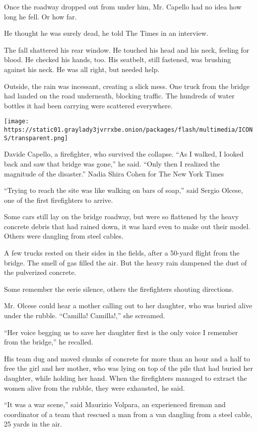 Once the roadway dropped out from under him, Mr. Capello had no idea how
long he fell. Or how far.

He thought he was surely dead, he told The Times in an interview.

The fall shattered his rear window. He touched his head and his neck,
feeling for blood. He checked his hands, too. His seatbelt, still
fastened, was brushing against his neck. He was all right, but needed
help.

Outside, the rain was incessant, creating a slick mess. One truck from
the bridge had landed on the road underneath, blocking traffic. The
hundreds of water bottles it had been carrying were scattered
everywhere.

\texttt{[image: https://static01.graylady3jvrrxbe.onion/packages/flash/multimedia/ICONS/transparent.png]}

Davide Capello, a firefighter, who survived the collapse. ``As I walked,
I looked back and saw that bridge was gone,'' he said. ``Only then I
realized the magnitude of the disaster.'' Nadia Shira Cohen for The New
York Times

``Trying to reach the site was like walking on bars of soap,'' said
Sergio Olcese, one of the first firefighters to arrive.

Some cars still lay on the bridge roadway, but were so flattened by the
heavy concrete debris that had rained down, it was hard even to make out
their model. Others were dangling from steel cables.

A few trucks rested on their sides in the fields, after a 50-yard flight
from the bridge. The smell of gas filled the air. But the heavy rain
dampened the dust of the pulverized concrete.

Some remember the eerie silence, others the firefighters shouting
directions.

Mr. Olcese could hear a mother calling out to her daughter, who was
buried alive under the rubble. ``Camilla! Camilla!,'' she screamed.

``Her voice begging us to save her daughter first is the only voice I
remember from the bridge,'' he recalled.

His team dug and moved chunks of concrete for more than an hour and a
half to free the girl and her mother, who was lying on top of the pile
that had buried her daughter, while holding her hand. When the
firefighters managed to extract the women alive from the rubble, they
were exhausted, he said.

``It was a war scene,'' said Maurizio Volpara, an experienced fireman
and coordinator of a team that rescued a man from a van dangling from a
steel cable, 25 yards in the air.

